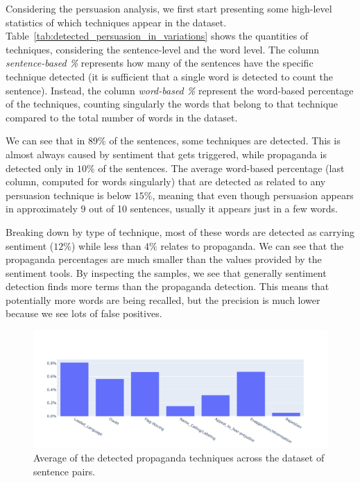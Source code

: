 Considering the persuasion analysis, we first start presenting some high-level statistics of which techniques appear in the dataset.
Table~\ref{tab:detected_persuasion_in_variations} shows the quantities of techniques, considering the sentence-level and the word level. The column \textit{sentence-based \%} represents how many of the sentences have the specific technique detected (it is sufficient that a single word is detected to count the sentence). Instead, the column \textit{word-based \%} represent the word-based percentage of the techniques, counting singularly the words that belong to that technique compared to the total number of words in the dataset.

We can see that in $89\%$
of the sentences, some techniques are detected.
This is almost always caused by sentiment that gets triggered, while propaganda is detected only in $10\%$ of the sentences.
The average word-based percentage (last column, computed for words singularly) that are detected as related to any persuasion technique is below $15\%$,
meaning that even though persuasion appears in approximately 9 out of 10 sentences, usually it appears just in a few words.

Breaking down by type of technique, most of these words are detected as carrying sentiment ($12\%$) while less than $4\%$ relates to propaganda.
We can see that the propaganda percentages are much smaller than the values provided by the sentiment tools.
By inspecting the samples, we see that generally sentiment detection finds more terms than the propaganda detection. This means that potentially more words are being recalled, but the precision is much lower because we see lots of false positives.

\begin{figure}[!htbp]
    \centering
    \includegraphics[width=\linewidth]{figures/4.3.1_propaganda_avg.pdf}
    \caption{Average of the detected propaganda techniques across the dataset of sentence pairs.}
    \label{fig:propaganda_avg}
\end{figure}

